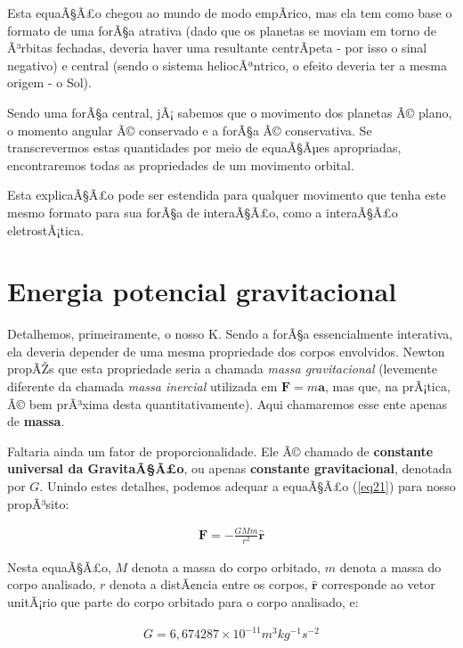 Esta equaÃ§Ã£o chegou ao mundo de modo empÃ­rico, mas ela tem como base o formato de uma forÃ§a atrativa (dado que os planetas se moviam em torno de Ã³rbitas fechadas, deveria haver uma resultante centrÃ­peta - por isso o sinal negativo) e central (sendo o sistema heliocÃªntrico, o efeito deveria ter a mesma origem - o Sol). {\\}

Sendo uma forÃ§a central, jÃ¡ sabemos que o movimento dos planetas Ã© plano, o momento angular Ã© conservado e a forÃ§a Ã© conservativa. Se transcrevermos estas quantidades por meio de equaÃ§Ãµes apropriadas, encontraremos todas as propriedades de um movimento orbital. {\\}

Esta explicaÃ§Ã£o pode ser estendida para qualquer movimento que tenha este mesmo formato para sua forÃ§a de interaÃ§Ã£o, como a interaÃ§Ã£o eletrostÃ¡tica.

\section{Energia potencial gravitacional}

Detalhemos, primeiramente, o nosso K. Sendo a forÃ§a essencialmente interativa, ela deveria depender de uma mesma propriedade dos corpos envolvidos. Newton propÃŽs que esta propriedade seria a chamada \textit{massa gravitacional} (levemente diferente da chamada \textit{massa inercial} utilizada em $\mathbf{F} = m\mathbf{a}$, mas que, na prÃ¡tica, Ã© bem prÃ³xima desta quantitativamente). Aqui chamaremos esse ente apenas de \textbf{massa}. {\\}

Faltaria ainda um fator de proporcionalidade. Ele Ã© chamado de \textbf{constante universal da GravitaÃ§Ã£o}, ou apenas \textbf{constante gravitacional}, denotada por $G$. Unindo estes detalhes, podemos adequar a equaÃ§Ã£o (\ref{eq21}) para nosso propÃ³sito:

\begin{eqnarray}
    \mathbf{F} = -\frac{GMm}{r^2}\mathbf{\hat{r}}    \label{eq22}
\end{eqnarray}

Nesta equaÃ§Ã£o, $M$ denota a massa do corpo orbitado, $m$ denota a massa do corpo analisado, $r$ denota a distÃ¢ncia entre os corpos, $\mathbf{\hat{r}}$ corresponde ao vetor unitÃ¡rio que parte do corpo orbitado para o corpo analisado, e:

\begin{eqnarray}
    G =  6,674287 \times 10^{-11}  m^3kg^{-1}s^{-2}   \label{eq23}
\end{eqnarray}

